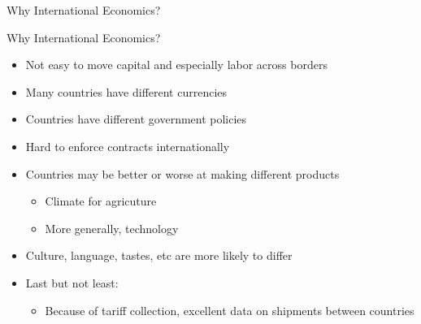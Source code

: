 \documentclass[ignorenonframetext,]{beamer}
\begin{document}
\begin{frame}{Why International Economics?}
\end{frame}


\begin{frame}{Why International Economics?}

    \begin{itemize}
        \item Not easy to move capital and especially labor across borders
        \item Many countries have different currencies
        \item Countries have different government policies 
        \item Hard to enforce contracts internationally
        \item Countries may be better or worse at making different products 
        \begin{itemize}
            \item Climate for agricuture
            \item More generally, technology
        \end{itemize}
        \item Culture, language, tastes, etc are more likely to differ
        \item Last but not least:
        \begin{itemize}
            \item Because of tariff collection, excellent data on shipments between countries
        \end{itemize}
    \end{itemize}
\end{frame}
    
\begin{frame}


\end{frame}
\end{document}

